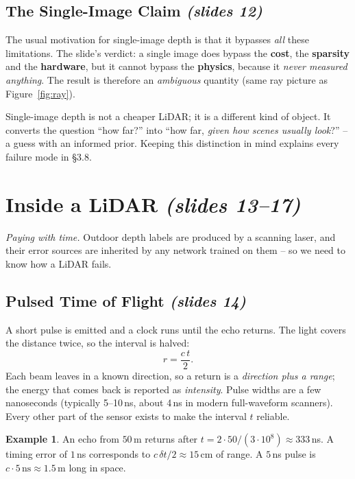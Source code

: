 \documentclass[11pt,a4paper]{article}
\numberwithin{equation}{section}
\newcommand{\slides}[1]{\texorpdfstring{\;\emph{(slides #1)}}{ (slides #1)}}
\theoremstyle{plain}
\theoremstyle{definition}
\newtheorem{example}[theorem]{Example}
\begin{document}
\subsection{The Single-Image Claim \slides{12}}
 
The usual motivation for single-image depth is that it bypasses \emph{all} these limitations. The slide's verdict: a single image does bypass the \textbf{cost}, the \textbf{sparsity} and the \textbf{hardware}, but it cannot bypass the \textbf{physics}, because it \emph{never measured anything}. The result is therefore an \emph{ambiguous} quantity (same ray picture as Figure~\ref{fig:ray}).
 
\begin{intuition}
Single-image depth is not a cheaper LiDAR; it is a different kind of object. It converts the question ``how far?'' into ``how far, \emph{given how scenes usually look}?'' -- a guess with an informed prior. Keeping this distinction in mind explains every failure mode in \S3.8.
\end{intuition}
 
\section{Inside a LiDAR \slides{13--17}}
\emph{Paying with time.} Outdoor depth labels are produced by a scanning laser, and their error sources are inherited by any network trained on them -- so we need to know how a LiDAR fails.
 
\subsection{Pulsed Time of Flight \slides{14}}
 
A short pulse is emitted and a clock runs until the echo returns. The light covers the distance twice, so the interval is halved:
\begin{equation}\label{eq:tof}
r=\frac{c\,t}{2}.
\end{equation}
Each beam leaves in a known direction, so a return is a \emph{direction plus a range}; the energy that comes back is reported as \emph{intensity}. Pulse widths are a few nanoseconds (typically 5--10\,ns, about 4\,ns in modern full-waveform scanners). Every other part of the sensor exists to make the interval $t$ reliable.
 
\begin{example}
An echo from $50$\,m returns after $t=2\cdot 50/(3\cdot10^8)\approx 333$\,ns. A timing error of $1$\,ns corresponds to $c\,\delta t/2\approx 15$\,cm of range. A $5$\,ns pulse is $c\cdot 5\,\text{ns}\approx1.5$\,m long in space.
\end{example}
 
\end{document}

